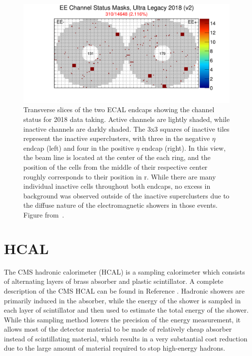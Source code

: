 \begin{figure}[htbp]
    \includegraphics[width=\textwidth]{figures/EEChannelMasks.png}
    \centering
	\caption[Masked ECAL cells]{Transverse slices of the two ECAL endcaps showing the channel status for 2018 data taking. Active channels are lightly shaded, while inactive channels are darkly shaded. The 3x3 squares of inactive tiles represent the inactive superclusters, with three in the negative $\eta$ endcap (left) and four in the positive $\eta$ endcap (right). In this view, the beam line is located at the center of the each ring, and the position of the cells from the middle of their respective center roughly corresponds to their position in r. While there are many individual inactive cells throughout both endcaps, no excess in background was observed outside of the inactive superclusters due to the diffuse nature of the electromagnetic showers in those events. Figure from~\cite{EcalDPG}.}
    \label{fig:EEmasks}
\end{figure}

\section{HCAL}
The CMS hadronic calorimeter (HCAL) is a sampling calorimeter which consists of alternating layers of brass absorber and plastic scintillator. 
A complete description of the CMS HCAL can be found in Reference \cite{HCALtdr}.
Hadronic showers are primarily induced in the absorber, while the energy of the shower is sampled in each layer of scintillator and then used to estimate the total energy of the shower. 
While this sampling method lowers the precision of the energy measurement, it allows most of the detector material to be made of relatively cheap absorber instead of scintillating material, which results in a very substantial cost reduction due to the large amount of material required to stop high-energy hadrons.

